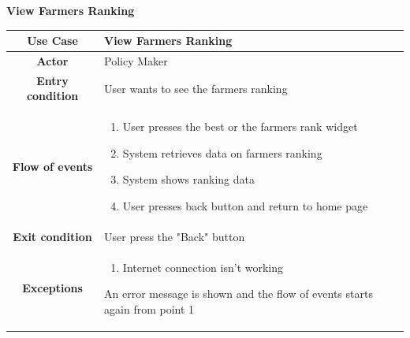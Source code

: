 \documentclass[table, 12pt]{article}
\begin{document}
\begin{itemize}
            \begin{table}[H]
                \item[] \textbf{View Farmers Ranking}
                \item[] 
                \centering
                \begin{tabular}{|c| m{}|}
                    \hline
                    \textbf{Use Case} & View Farmers Ranking\\ \hline
                    \textbf{Actor} & Policy Maker\\ \hline
                    \textbf{Entry condition} & User wants to see the farmers ranking\\  \hline
                    \textbf{Flow of events} & \begin{enumerate}
                                                \item User presses the best or the farmers rank widget
                                                \item System retrieves data on farmers ranking
                                                \item System shows ranking data
                                                \item User presses back button and return to home page
                                            \end{enumerate}\\ \hline
                    \textbf{Exit condition} & User press the "Back" button\\ \hline
                    \textbf{Exceptions} &  \begin{enumerate}
                        \item Internet connection isn't working
                    \end{enumerate}
                    An error message is shown and the flow of events starts again from point 1\\ \hline                    
                \end{tabular}
            \end{table}


\end{itemize}
\end{document}
